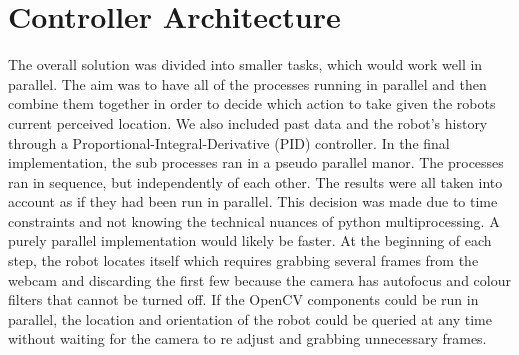 \section{Controller Architecture}
\label{section::controller}

The overall solution was divided into smaller tasks, which would work well in parallel. The aim was to have all of the processes running in parallel and then combine them together in order to decide which action to take given the robots current perceived location. We also included past data and the robot’s history through a Proportional-Integral-Derivative (PID) controller. In the final implementation, the sub processes ran in a pseudo parallel manor. The processes ran in sequence, but independently of each other.  The results were all taken into account as if they had been run in parallel. This decision was made due to time constraints and not knowing the technical nuances of python multiprocessing. A purely parallel implementation would likely be faster. At the beginning of each step, the robot locates itself which requires grabbing several frames from the webcam and discarding the first few because the camera has autofocus and colour filters that cannot be turned off. If the OpenCV components could be run in parallel, the location and orientation of the robot could be queried at any time without waiting for the camera to re adjust and grabbing unnecessary frames.
